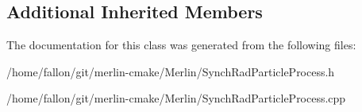 \subsection*{Additional Inherited Members}


The documentation for this class was generated from the following files\+:\begin{DoxyCompactItemize}
\item 
/home/fallon/git/merlin-\/cmake/\+Merlin/Synch\+Rad\+Particle\+Process.\+h\item 
/home/fallon/git/merlin-\/cmake/\+Merlin/Synch\+Rad\+Particle\+Process.\+cpp\end{DoxyCompactItemize}
